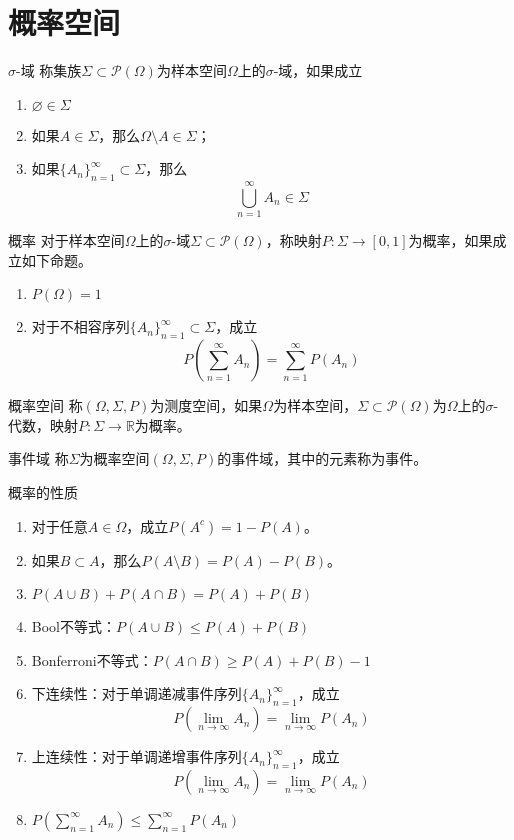 \documentclass[lang = cn, scheme = chinese, thmcnt = section]{elegantbook}
\newcommand{\R}{\mathbb{R}}            %
\newcommand{\sub}{\subset}             %
\newcommand{\dis}{\displaystyle}
\begin{document}
\section{概率空间}

\begin{definition}{$\sigma$-域}
	称集族$\Sigma\sub\mathscr{P}(\Omega)$为样本空间$\Omega$上的$\sigma$-域，如果成立
	\begin{enumerate}
		\item $\varnothing\in\Sigma$
		\item 如果$A\in\Sigma$，那么$\Omega\setminus A\in\Sigma$；
		\item 如果$\{ A_n \}_{n=1}^{\infty}\sub \Sigma$，那么
		$$
		\bigcup_{n=1}^{\infty}{A_n}\in\Sigma
		$$
	\end{enumerate}
\end{definition}

\begin{definition}{概率}
	对于样本空间$\Omega$上的$\sigma$-域$\Sigma\sub\mathscr{P}(\Omega)$，称映射$P:\Sigma\to [0,1]$为概率，如果成立如下命题。
	\begin{enumerate}
		\item $P(\Omega)=1$
		\item 对于不相容序列$\{A_n\}_{n=1}^{\infty}\sub \Sigma$，成立
		$$
		P\left(\sum_{n=1}^{\infty}A_n\right)=\sum_{n=1}^{\infty}P(A_n)
		$$
	\end{enumerate}
\end{definition}

\begin{definition}{概率空间}
	称$(\Omega,\Sigma,P)$为测度空间，如果$\Omega$为样本空间，$\Sigma\sub\mathscr{P}(\Omega)$为$\Omega$上的$\sigma$-代数，映射$P:\Sigma\to \R$为概率。
\end{definition}

\begin{definition}{事件域}
	称$\Sigma$为概率空间$(\Omega,\Sigma,P)$的事件域，其中的元素称为事件。
\end{definition}

\begin{proposition}{概率的性质}
	\begin{enumerate}
		\item 对于任意$A\in\Omega$，成立$P(A^c)=1-P(A)$。
		\item 如果$B\sub A$，那么$P(A\setminus B)=P(A)-P(B)$。
		\item $P(A\cup B)+P(A\cap B)=P(A)+P(B)$
		\item Bool不等式：$P(A\cup B)\le P(A)+P(B)$
		\item Bonferroni不等式：$P(A\cap B)\ge P(A)+P(B)-1$
		\item 下连续性：对于单调递减事件序列$\{A_n\}_{n=1}^{\infty}$，成立
		$$
		P\left(\lim_{n\to\infty}{A_n}\right)=\lim_{n\to\infty}{P(A_n)}
		$$
		\item 上连续性：对于单调递增事件序列$\{A_n\}_{n=1}^{\infty}$，成立
		$$
		P\left(\lim_{n\to\infty}{A_n}\right)=\lim_{n\to\infty}{P(A_n)}
		$$
		\item $\dis P\left(\sum_{n=1}^{\infty}{A_n}\right)\le\sum_{n=1}^{\infty}{P(A_n)}$
	\end{enumerate}
\end{proposition}
\end{document}
